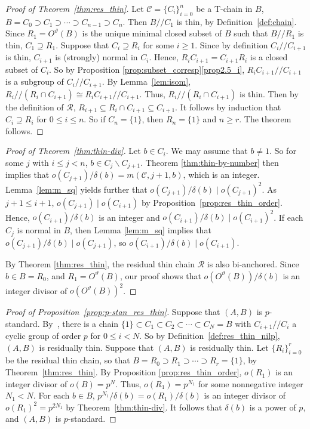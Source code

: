\begin{proof} [Proof of Theorem~\ref{thm:res_thin}] 
Let $\mathcal{C} = \{C_i\}_{i=0}^n$ be a T-chain in $B$, $B = C_0
\supset C_1 \supset \cdots \supset C_{n-1} \supset C_n$. Then $B//C_1$
is thin, by Definition~\ref{def:chain}. Since $R_1 = O^{\vartheta}(B)$
is the unique minimal closed subset of $B$ such that $B//R_1$ is thin,
$C_1 \supseteq R_1$. Suppose that $C_i \supseteq R_i$ for some $i \geq
1$. Since by definition $C_i//C_{i+1}$ is thin, $C_{i+1}$ is (strongly)
normal in $C_i$. Hence, $R_iC_{i+1} = C_{i+1}R_i$ is a closed subset of
$C_i$. So by Proposition
\ref{prop:subset_corresp}\ref{prop2.5_i}, $R_iC_{i+1}//C_{i+1}$ is a subgroup of
$C_i//C_{i+1}$. By Lemma~\ref{lem:isom}, $R_i//(R_i\cap C_{i+1}) \cong
R_iC_{i+1}//C_{i+1}$. Thus, $R_i//(R_i\cap C_{i+1})$ is thin. Then by
the definition of $\mathcal{R}$, $R_{i+1} \subseteq R_i\cap C_{i+1}
\subseteq C_{i+1}$. It follows by induction that $C_i \supseteq R_i$
for $0 \leq i \leq n$. So if $C_n = \{1\}$, then $R_n = \{1\}$ and $n
\geq r$. The theorem follows.
\end{proof}

\begin{proof} [Proof of Theorem~\ref{thm:thin-div}]
Let $b \in C_i$. We may assume that $b \neq 1$. So for some $j$ with
$i \leq j < n$, $b \in C_j\backslash C_{j+1}$. Theorem
\ref{thm:thin-by-number} then implies that $o(C_{j+1})/\delta(b) =
m(\mathcal{C}, j+1, b)$, which is an integer. Lemma~\ref{lem:m_sq}
yields further that $o(C_{j+1})/\delta(b) \mid o(C_{j+1})^2$. As $j+1 \leq i+1$,
$o(C_{j+1}) \mid o(C_{i+1})$ by Proposition~\ref{prop:res_thin_order}.
Hence, $o(C_{i+1})/\delta(b)$ is an integer and $o(C_{i+1})/\delta(b) 
\mid o(C_{i+1})^2$. If each $C_j$ is normal in $B$, then Lemma
\ref{lem:m_sq} implies that $o(C_{j+1})/\delta(b) \mid o(C_{j+1})$, so
$o(C_{i+1})/\delta(b) \mid o(C_{i+1})$. 

By Theorem
\ref{thm:res_thin}, the residual thin chain $\mathcal{R}$ is also
bi-anchored. Since $b \in B = R_0$, and $R_1 = O^{\vartheta}(B)$, our
proof shows that $o(O^{\vartheta}(B))/\delta(b)$ is an integer divisor
of $o(O^{\vartheta}(B))^2$.
\end{proof}

\begin{proof} [Proof of Proposition~\ref{prop:p-stan_res_thin}]
Suppose that $(A, B)$ is $p$-standard. By~\cite [Proposition~3.2]{BC},
there is a chain $\{1\} \subset C_1 \subset C_2 \subset \cdots \subset
C_N = B$ with $C_{i+1}//C_i$ a cyclic group of order $p$ for $0 \leq i <
N$. So by Definition~\ref{def:res_thin_nilp}, $(A, B)$ is residually
thin.
Suppose that $(A, B)$ is residually thin. Let $\{R_i\}_{i=0}^r$ be the
residual thin chain, so that $B = R_0 \supset R_1 \supset \cdots \supset
R_r = \{1\}$, by Theorem~\ref{thm:res_thin}. By Proposition
\ref{prop:res_thin_order}, $o(R_1)$ is an integer divisor of $o(B) =
p^N$. Thus, $o(R_1) = p^{N_1}$ for some nonnegative integer $N_1 < N$.
For each $b \in B$, $p^{N_1}/\delta(b) = o(R_1)/\delta(b)$ is an integer
divisor of $o(R_1)^2 = p^{2N_1}$ by Theorem~\ref{thm:thin-div}. It
follows that $\delta(b)$ is a power of $p$, and $(A, B)$ is
$p$-standard.
\end{proof}
 
